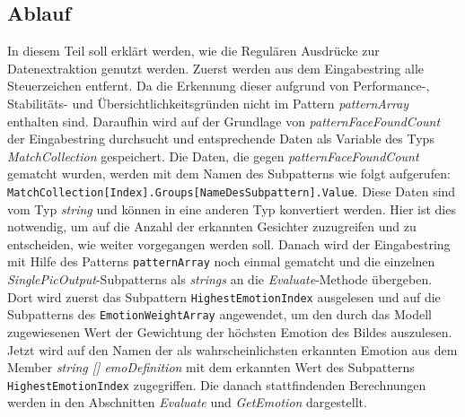 \documentclass[10pt,a4paper]{report}
\begin{document}
\subsection{Ablauf}
In diesem Teil soll erklärt werden, wie die Regulären Ausdrücke zur Datenextraktion genutzt werden. Zuerst werden aus dem Eingabestring alle Steuerzeichen entfernt. Da die Erkennung dieser aufgrund
 von Performance-, Stabilitäts- und Übersichtlichkeitsgründen nicht im Pattern \textit{patternArray} enthalten sind. Daraufhin wird auf der Grundlage von \textit{patternFaceFoundCount}
 der Eingabestring durchsucht und entsprechende Daten als Variable des Typs \textit{MatchCollection} gespeichert. Die Daten, die gegen \textit{patternFaceFoundCount} gematcht wurden, werden mit dem Namen
 des Subpatterns wie folgt aufgerufen: \texttt{MatchCollection[Index].Groups[NameDesSubpattern].Value}. Diese Daten sind vom Typ \textit{string} und können  in eine anderen Typ konvertiert werden. Hier ist dies notwendig, um auf die Anzahl der erkannten Gesichter zuzugreifen und zu entscheiden, wie weiter vorgegangen werden soll.
 Danach wird der Eingabestring mit Hilfe des Patterns \texttt{patternArray} noch einmal gematcht und die einzelnen \textit{SinglePicOutput}-Subpatterns als \textit{strings} an die \textit{Evaluate}-Methode übergeben. Dort wird zuerst das Subpattern \texttt{HighestEmotionIndex} ausgelesen und auf die Subpatterns des \texttt{EmotionWeightArray} angewendet, um den durch das Modell zugewiesenen Wert der Gewichtung der höchsten Emotion des Bildes auszulesen. Jetzt wird auf den Namen der als wahrscheinlichsten erkannten Emotion aus dem Member \textit{string [] emoDefinition} mit dem erkannten Wert des Subpatterns \texttt{HighestEmotionIndex} zugegriffen. Die danach stattfindenden Berechnungen werden in den Abschnitten \textit{Evaluate} und \textit{GetEmotion} dargestellt. 




%
\end{document}
